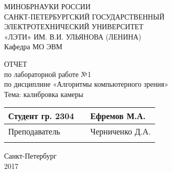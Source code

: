 \clearpage
\begin{center}	
	МИНОБРНАУКИ РОССИИ\\
	САНКТ-ПЕТЕРБУРГСКИЙ ГОСУДАРСТВЕННЫЙ\\
	ЭЛЕКТРОТЕХНИЧЕСКИЙ УНИВЕРСИТЕТ\\
	«ЛЭТИ» ИМ. В.И. УЛЬЯНОВА (ЛЕНИНА)\\
	Кафедра МО ЭВМ

	\vspace{54mm}

	ОТЧЕТ\\
	по лабораторной работе №1 \\
	по дисциплине «Алгоритмы компьютерного зрения» \\
	Тема: калибровка камеры \\

	\vspace{65mm}

	\def\arraystretch{1.5}
	\begin{tabularx}{\textwidth}{ >{\hsize=7cm}X >{\hsize=4.1cm}X  >{\centering\arraybackslash}X }
		Студент гр. 2304 & & Ефремов М.А. \\ \cline{2-2}
		Преподаватель & & Черниченко Д.А. \\ \cline{2-2}
	\end{tabularx}
	\def\arraystretch{1}

	\vfill
	Санкт-Петербург\\
	2017
\end{center}
\newpage
{}
\setcounter{page}{1}